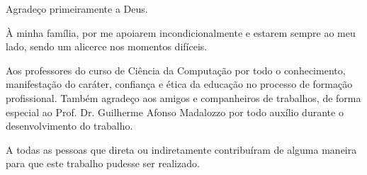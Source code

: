 
\begin{resumo}[AGRADECIMENTOS]
\begin{SingleSpacing}

Agradeço primeiramente a Deus.

À minha família, por me apoiarem incondicionalmente e estarem sempre ao meu lado, sendo um alicerce nos momentos difíceis.

Aos professores do curso de Ciência da Computação por todo o conhecimento, manifestação do caráter, confiança e ética da educação no processo de formação profissional. Também agradeço aos amigos e companheiros de trabalhos, de forma especial ao Prof. Dr. Guilherme Afonso Madalozzo por todo auxílio durante o desenvolvimento do trabalho. 

A todas as pessoas que direta ou indiretamente contribuíram de alguma maneira para que este trabalho pudesse ser realizado.

\end{SingleSpacing}
\end{resumo}